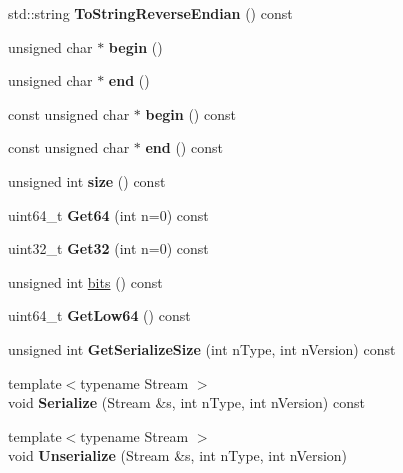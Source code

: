 \begin{DoxyCompactItemize}
std\+::string {\bfseries To\+String\+Reverse\+Endian} () const
\item 
\mbox{\label{classbase__uint_aaa32054bf4e8fbb31d54a75f6065174d}} 
unsigned char $\ast$ {\bfseries begin} ()
\item 
\mbox{\label{classbase__uint_a76539ef6be800bc02e4038f457a4f74a}} 
unsigned char $\ast$ {\bfseries end} ()
\item 
\mbox{\label{classbase__uint_a41237a3bb063583fa001e96f654fbb19}} 
const unsigned char $\ast$ {\bfseries begin} () const
\item 
\mbox{\label{classbase__uint_a205d89f7614095c6c8badb1e3dfa0f0f}} 
const unsigned char $\ast$ {\bfseries end} () const
\item 
\mbox{\label{classbase__uint_a1f49b034e686269601ea89b0319b8004}} 
unsigned int {\bfseries size} () const
\item 
\mbox{\label{classbase__uint_aae5336be1799bd2debf74efb1d2cc542}} 
uint64\+\_\+t {\bfseries Get64} (int n=0) const
\item 
\mbox{\label{classbase__uint_ac3d25db757d5e8e3328cf35e81c40850}} 
uint32\+\_\+t {\bfseries Get32} (int n=0) const
\item 
unsigned int \mbox{\hyperlink{classbase__uint_afe1eacc0b592cf184ac8ee0446997fbe}{bits}} () const
\item 
\mbox{\label{classbase__uint_ad8dbf3216dd15a64f1598344ad7a71ea}} 
uint64\+\_\+t {\bfseries Get\+Low64} () const
\item 
\mbox{\label{classbase__uint_aa1830b40b57801f1e489adbf4c55ebd9}} 
unsigned int {\bfseries Get\+Serialize\+Size} (int n\+Type, int n\+Version) const
\item 
\mbox{\label{classbase__uint_a2f80cbf71c59275037810824dae9f0d0}} 
{\footnotesize template$<$typename Stream $>$ }\\void {\bfseries Serialize} (Stream \&s, int n\+Type, int n\+Version) const
\item 
\mbox{\label{classbase__uint_adf1ad639d94997a9cda95e0c424ab51a}} 
{\footnotesize template$<$typename Stream $>$ }\\void {\bfseries Unserialize} (Stream \&s, int n\+Type, int n\+Version)
\end{DoxyCompactItemize}
